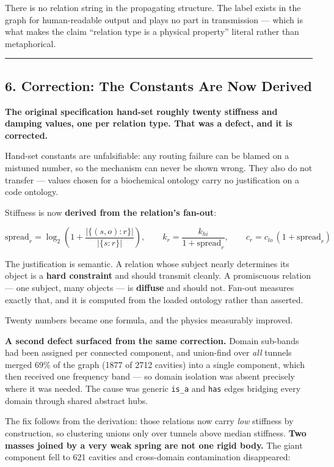 \documentclass[
  11pt,
  a4paper,
]{article}
\begin{document}
There is no relation string in the propagating structure. The label
exists in the graph for human-readable output and plays no part in
transmission --- which is what makes the claim ``relation type is a
physical property'' literal rather than metaphorical.

\begin{center}\rule{0.5\linewidth}{0.5pt}\end{center}

\subsection{6. Correction: The Constants Are Now
Derived}\label{correction-the-constants-are-now-derived}

\textbf{The original specification hand-set roughly twenty stiffness and
damping values, one per relation type. That was a defect, and it is
corrected.}

Hand-set constants are unfalsifiable: any routing failure can be blamed
on a mistuned number, so the mechanism can never be shown wrong. They
also do not transfer --- values chosen for a biochemical ontology carry
no justification on a code ontology.

Stiffness is now \textbf{derived from the relation's fan-out}:

\[
\text{spread}_r = \log_2\!\left(1 + \frac{|\{(s,o) : r\}|}{|\{s : r\}|}\right),
\qquad
k_r = \frac{k_{hi}}{1 + \text{spread}_r},
\qquad
c_r = c_{lo}\,(1 + \text{spread}_r)
\]

The justification is semantic. A relation whose subject nearly
determines its object is a \textbf{hard constraint} and should transmit
cleanly. A promiscuous relation --- one subject, many objects --- is
\textbf{diffuse} and should not. Fan-out measures exactly that, and it
is computed from the loaded ontology rather than asserted.

Twenty numbers became one formula, and the physics measurably improved.

\textbf{A second defect surfaced from the same correction.} Domain
sub-bands had been assigned per connected component, and union-find over
\emph{all} tunnels merged 69\% of the graph (1877 of 2712 cavities) into
a single component, which then received one frequency band --- so domain
isolation was absent precisely where it was needed. The cause was
generic \texttt{is\_a} and \texttt{has} edges bridging every domain
through shared abstract hubs.

The fix follows from the derivation: those relations now carry
\emph{low} stiffness by construction, so clustering unions only over
tunnels above median stiffness. \textbf{Two masses joined by a very weak
spring are not one rigid body.} The giant component fell to 621 cavities
and cross-domain contamination disappeared:
\end{document}
